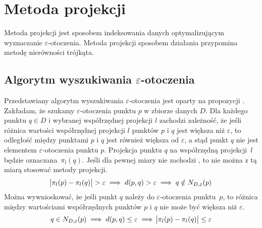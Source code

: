 \section{Metoda projekcji}
Metoda projekcji jest sposobem indeksowania danych optymalizującym wyznaczanie $ \varepsilon $-otoczenia. Metoda projekcji sposobem działania przypomina metodę nierówności trójkąta.
\subsection{Algorytm wyszukiwania $ \varepsilon $-otoczenia}
Przedstawiany algorytm wyszukiwania $\varepsilon$-otoczenia jest oparty na propozycji \cite{tivsp}. Zakładam, że szukamy $ \varepsilon $-otoczenia punktu $ p $ w zbiorze danych $ D $. Dla każdego punktu $ q \in D $ i wybranej współrzędnej projekcji $ l $ zachodzi zależność, że jeśli różnica wartości współrzędnej projekcji $ l $ punktów $ p $ i $ q $ jest większa niż $ \varepsilon $, to odległość między punktami $ p $ i $ q $ jest również większa od $ \varepsilon $, a stąd punkt $ q $ nie jest elementem $ \varepsilon $-otoczenia punktu $ p $. Projekcja punktu $ q $ na współrzędną \mbox{projekcji $ l $} będzie \mbox{oznaczana $ \pi_l(q) $}. Jeśli dla pewnej miary nie zachodzi , to nie można z tą miarą stosować metody projekcji. 
\begin{equation} \label{eq:projection-raw}
	\abs{\pi_l(p) - \pi_l(q)} > \varepsilon \implies d(p,q) > \varepsilon	\implies q \notin N_{D,\varepsilon}(p)
\end{equation}
Można wywnioskować, że jeśli punkt $ q $ należy do $ \varepsilon $-otoczenia \mbox{punktu $ p $}, to różnica między wartościami współrzędnych punktów $ p $ i $ q $ nie może być większa niż $ \varepsilon $.
\begin{equation}\label{eq:projection}
	q \in N_{D,\varepsilon}(p) \implies d(p,q) \le \varepsilon \implies \abs{\pi_l(p) - \pi_l(q)} \le \varepsilon
\end{equation}
